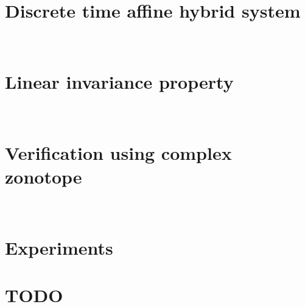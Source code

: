 \section{Discrete time affine hybrid system}~\label{sec:hybrid-system}


\section{Linear invariance property}~\label{sec:linear-invariance}


\section{Verification using complex zonotope}~\label{sec:verification-invariance}


\section{Experiments}


\section{TODO}

